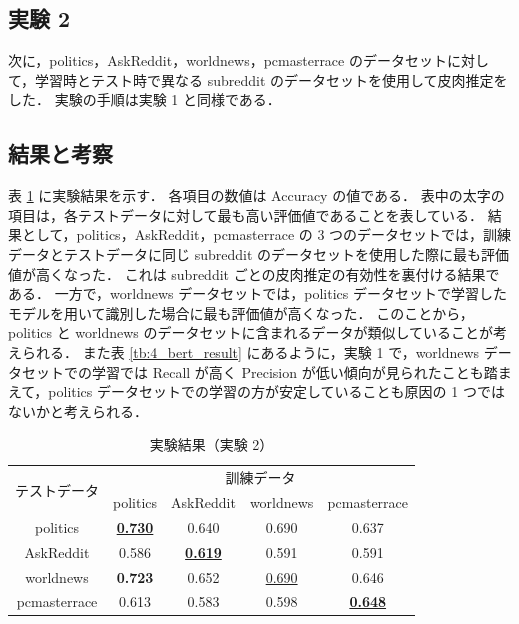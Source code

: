 %

\subsection{実験 2}

次に，politics，AskReddit，worldnews，pcmasterrace のデータセットに対して，学習時とテスト時で異なる subreddit のデータセットを使用して皮肉推定をした．
実験の手順は実験 1 と同様である．


\subsection{結果と考察}
表 \ref{tb:4_result2} に実験結果を示す．
各項目の数値は Accuracy の値である．
表中の太字の項目は，各テストデータに対して最も高い評価値であることを表している．
結果として，politics，AskReddit，pcmasterrace の 3 つのデータセットでは，訓練データとテストデータに同じ subreddit のデータセットを使用した際に最も評価値が高くなった．
これは subreddit ごとの皮肉推定の有効性を裏付ける結果である．
一方で，worldnews データセットでは，politics データセットで学習したモデルを用いて識別した場合に最も評価値が高くなった．
このことから，politics と worldnews のデータセットに含まれるデータが類似していることが考えられる．
また表 \ref{tb:4_bert_result} にあるように，実験 1 で，worldnews データセットでの学習では Recall が高く Precision が低い傾向が見られたことも踏まえて，politics データセットでの学習の方が安定していることも原因の 1 つではないかと考えられる．


\begin{table}[b]
  \caption{実験結果（実験 2）}
  \label{tb:4_result2}
  \centering
  \begin{tabular}{c c c c c} \hline

\multirow{2}{*}{テストデータ} & \multicolumn{4}{c}{訓練データ} \\ \cline{2-5}
 & politics & AskReddit & worldnews & pcmasterrace \\ \hline
politics & \textbf{\underline{0.730}} & 0.640 & 0.690 & 0.637 \\
AskReddit & 0.586 & \textbf{\underline{0.619}} & 0.591 & 0.591 \\
worldnews & \textbf{0.723} & 0.652 & \underline{0.690} & 0.646 \\
pcmasterrace & 0.613 & 0.583 & 0.598 & \textbf{\underline{0.648}} \\ \hline

  \end{tabular}
\end{table}


